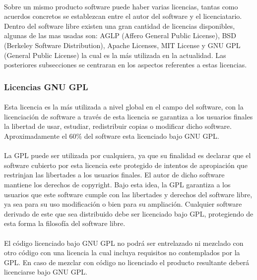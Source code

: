 \documentclass[10pt]{article}
\begin{document}
            \paragraph{}
            Sobre un mismo producto software puede haber varias licencias, tantas como acuerdos concretos se establezcan entre el autor del software y el licenciatario. Dentro del software libre existen una gran cantidad de licencias disponibles, algunas de las mas usadas son: AGLP (Affero General Public License), BSD (Berkeley Software Distribution), Apache Licenses, MIT License y GNU GPL (General Public License) la cual es la más utilizada en la actualidad. Las posteriores subsecciones se centraran en los aspectos referentes a estas licencias.\cite{BBVA:Licencias} \cite{UCLM:Licencias}
            
            \subsubsection{Licencias GNU GPL}
            	\paragraph{}
                Esta licencia es la más utilizada a nivel global en el campo del software, con la licenciación de software a través de esta licencia se garantiza a los usuarios finales la libertad de usar, estudiar, redistribuir copias o modificar dicho software. Aproximadamente el 60\% del software esta licenciado bajo GNU GPL.
                
                \paragraph{}
                La GPL puede ser utilizada por cualquiera, ya que su finalidad es declarar que el software cubierto por esta licencia este protegido de intentos de apropiación que restrinjan las libertades a los usuarios finales. El autor de dicho software mantiene los derechos de copyright. Bajo esta idea, la GPL garantiza a los usuarios que este software cumple con las libertades y derechos del software libre, ya sea para su uso modificación o bien para su ampliación. Cualquier software derivado de este que sea distribuido debe ser licenciado bajo GPL, protegiendo de esta forma la filosofía del software libre.
                
                \paragraph{}
                El código licenciado bajo GNU GPL no podrá ser entrelazado ni mezclado con otro código con una licencia la cual incluya requisitos no contemplados por la GPL. En caso de mezclar con código no licenciado el producto resultante deberá licenciarse bajo GNU GPL.
                
\end{document}

